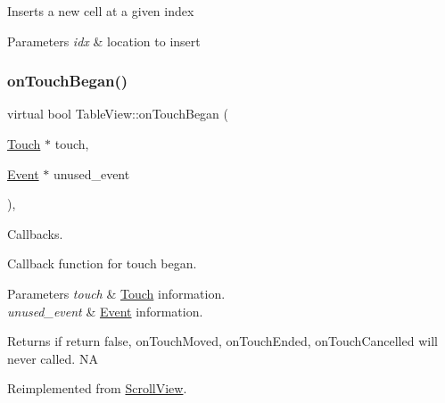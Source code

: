 Inserts a new cell at a given index


\begin{DoxyParams}{Parameters}
{\em idx} & location to insert \\
\hline
\end{DoxyParams}
\mbox{\label{classTableView_a195a00658f0ba79be1b59935569c3c7c}} 
\subsubsection{\texorpdfstring{on\+Touch\+Began()}{onTouchBegan()}\hspace{0.1cm}{\footnotesize\ttfamily [1/2]}}
{\footnotesize\ttfamily virtual bool Table\+View\+::on\+Touch\+Began (\begin{DoxyParamCaption}\item[{\hyperlink{classTouch}{Touch} $\ast$}]{touch,  }\item[{\hyperlink{classEvent}{Event} $\ast$}]{unused\+\_\+event }\end{DoxyParamCaption})\hspace{0.3cm}{\ttfamily [override]}, {\ttfamily [virtual]}}



Callbacks. 

Callback function for touch began.


\begin{DoxyParams}{Parameters}
{\em touch} & \hyperlink{classTouch}{Touch} information. \\
\hline
{\em unused\+\_\+event} & \hyperlink{classEvent}{Event} information. \\
\hline
\end{DoxyParams}
\begin{DoxyReturn}{Returns}
if return false, on\+Touch\+Moved, on\+Touch\+Ended, on\+Touch\+Cancelled will never called.  NA 
\end{DoxyReturn}


Reimplemented from \hyperlink{classScrollView_a18daa7ba9b5f802e65a6df2dde10a625}{Scroll\+View}.

\mbox{\label{classTableView_a57908fcd3fe592e50ff721dd84675a01}} 
